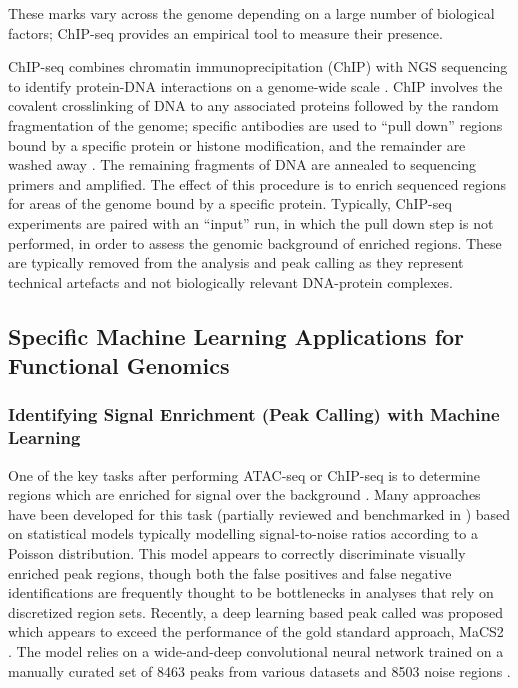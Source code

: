 These marks vary across the genome depending on a large number of biological factors; ChIP-seq provides an empirical tool to measure their presence. 

ChIP-seq combines chromatin immunoprecipitation (ChIP) with NGS sequencing to identify protein-DNA interactions on a genome-wide scale \cite{Park2009a}. ChIP involves the covalent crosslinking of DNA to any associated proteins followed by the random fragmentation of the genome; specific antibodies are used to ``pull down'' regions bound by a specific protein or histone modification, and the remainder are washed away \cite{Nakato2021,Furey2012}. The remaining fragments of DNA are annealed to sequencing primers and amplified. The effect of this procedure is to enrich sequenced regions for areas of the genome bound by a specific protein. Typically, ChIP-seq experiments are paired with an ``input'' run, in which the pull down step is not performed, in order to assess the genomic background of enriched regions. These are typically removed from the analysis and peak calling as they represent technical artefacts and not biologically relevant DNA-protein complexes. 

\subsection{Specific Machine Learning Applications for Functional Genomics}

\subsubsection{Identifying Signal Enrichment (Peak Calling) with Machine Learning} \label{intro:pc}

One of the key tasks after performing ATAC-seq or ChIP-seq is to determine regions which are enriched for signal over the background \cite{Yan2020a}. Many approaches have been developed for this task (partially reviewed and benchmarked in \textcite{R2017}) based on statistical models typically modelling signal-to-noise ratios according to a Poisson distribution. This model appears to correctly discriminate visually enriched peak regions, though both the false positives and false negative identifications are frequently thought to be bottlenecks in analyses that rely on discretized region sets. Recently, a deep learning based peak called was proposed which appears to exceed the performance of the gold standard approach, MaCS2 \cite{Hentges2021a,Zhang2008,Gaspar2018}. The model relies on a wide-and-deep convolutional neural network trained on a manually curated set of 8463 peaks from various \textcite{ENCODEProjectConsortium2012} datasets and 8503 noise regions \cite{Cheng2016,Hentges2021a}. 


